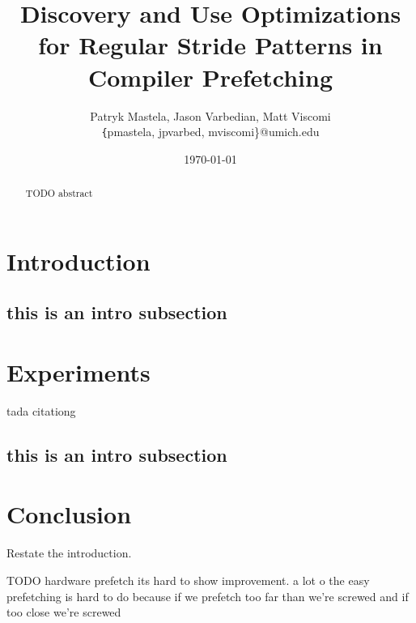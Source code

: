 \documentclass[11pt]{article}
\title{Discovery and Use Optimizations for Regular Stride Patterns in Compiler Prefetching}
\author{Patryk Mastela, Jason Varbedian, Matt Viscomi \\
\small \texttt \{pmastela, jpvarbed, mviscomi\}@umich.edu}
\date{\today}
\begin{document}
  \maketitle
  \begin{abstract}
    TODO abstract
  \end{abstract}
  
  \section{Introduction}
  \subsection{this is an intro subsection}
  
  \section{Experiments}
  tada citationg ~\cite{Wu2002}
  \subsection{this is an intro subsection}

  \section{Conclusion}
  Restate the introduction.
  
  TODO hardware prefetch 
      its hard to show improvement. a lot o the easy prefetching is hard to do because if we prefetch too far than we're screwed and if too close we're screwed
  {}
  
\end{document}
